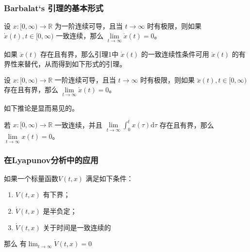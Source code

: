 \begin{frame}
  \frametitle{Barbalat‘s 引理的基本形式}

  \begin{lemma}
  设 $x:[0, \infty) \to \mathbb{R}$ 为一阶连续可导，且当 $t \to \infty$ 时有极限，则如果 $\dot{x}(t), t \in [0, \infty)$ 一致连续，那么 $\lim\limits_{t \to \infty} \dot{x}(t) = 0$。
  \end{lemma} 

  如果 $\ddot{x}(t)$ 存在且有界，那么引理1中 $\dot{x}(t)$ 的一致连续性条件可用 $\ddot{x}(t)$ 的有界性来替代，从而得到如下形式的引理。

  \begin{lemma}
  设 $x:[0, \infty) \to \mathbb{R}$ 一阶连续可导，且当 $t \to \infty$ 时有极限，则如果 $\ddot{x}(t), t \in [0, \infty)$ 存在且有界，那么 $\lim\limits_{t \to \infty} \dot{x}(t) = 0$。
  \end{lemma}

  如下推论是显而易见的。

  \begin{corollary}
    若 $x: [0, \infty) \to \mathbb{R}$ 一致连续，并且 $\lim\limits_{t \to \infty} \int_{0}^{t} x(\tau) \mathrm{d}\tau$ 存在且有界，那么 $\lim\limits_{t \to \infty} x(t) = 0$。
  \end{corollary}
\end{frame}

\begin{frame}
  \frametitle{在Lyapunov分析中的应用}  
  \begin{theorem}
    如果一个标量函数$V(t,x)$ 满足如下条件：
    \begin{enumerate}
      \item $V(t,x)$ 有下界；
      \item $\dot{V}(t,x)$ 是半负定；
      \item $\dot{V}(t,x)$ 关于时间是一致连续的
    \end{enumerate}
    那么 有$\lim_{t\to\infty} \dot{V}(t,x)=0$
  \end{theorem} 
\end{frame}